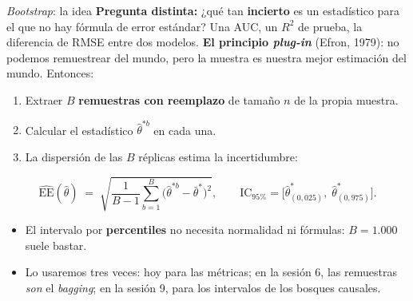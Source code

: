\documentclass{beamer}
\newcommand{\1}{\mathbb{I}}
\begin{document}
\begin{frame}{\emph{Bootstrap}: la idea}
\small
\textbf{Pregunta distinta:} ¿qué tan \textbf{incierto} es un estadístico para el que no hay fórmula de error estándar? Una AUC, un $R^2$ de prueba, la diferencia de RMSE entre dos modelos.
\pause
\vspace{0.1cm}
\textbf{El principio \emph{plug-in}} (Efron, 1979): no podemos remuestrear del mundo, pero la muestra es nuestra mejor estimación del mundo. Entonces:
\begin{enumerate}\itemsep3pt
  \item Extraer $B$ \textbf{remuestras con reemplazo} de tamaño $n$ de la propia muestra.
  \item Calcular el estadístico $\hat{\theta}^{*b}$ en cada una.
  \item La dispersión de las $B$ réplicas estima la incertidumbre:
\end{enumerate}
\[ \widehat{\mathrm{EE}}(\hat{\theta}) \;=\; \sqrt{ \frac{1}{B-1} \sum_{b=1}^{B} \big( \hat{\theta}^{*b} - \bar{\theta}^{*} \big)^2 }, \qquad \text{IC}_{95\%} = \big[ \hat{\theta}^{*}_{(0{,}025)},\; \hat{\theta}^{*}_{(0{,}975)} \big]. \]
\pause
\begin{itemize}\itemsep3pt
  \item El intervalo por \textbf{percentiles} no necesita normalidad ni fórmulas: $B = 1.000$ suele bastar.
  \item Lo usaremos tres veces: hoy para las métricas; en la sesión 6, las remuestras \emph{son} el \emph{bagging}; en la sesión 9, para los intervalos de los bosques causales.
\end{itemize}
\end{frame}
\end{document}
